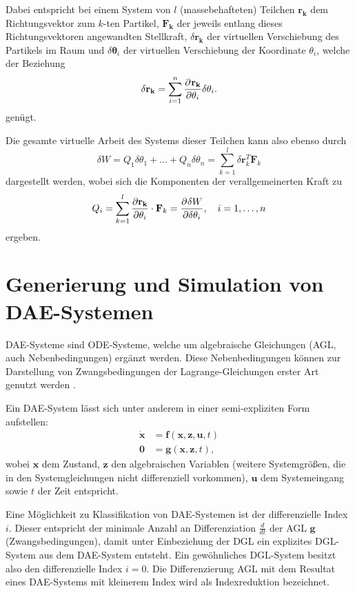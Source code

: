 Dabei entspricht bei einem System von $l$ (massebehafteten) Teilchen $\mathbf{r_k}$ dem Richtungsvektor zum $k$-ten Partikel, $\mathbf{F_k}$ der jeweils entlang dieses Richtungsvektoren angewandten Stellkraft, $\delta \mathbf{r_{k}}$ der virtuellen Verschiebung des Partikels im Raum und $\delta \mathbf{\theta}_{i}$ der virtuellen Verschiebung der Koordinate $\theta_i$, welche der Beziehung
\begin{equation}
	\delta \mathbf{r_{k}} = \sum_{i = 1}^{n} \frac{\partial^{}\mathbf{r_{k}}}{\partial{\theta_i}^{}} \delta \theta_i.
\end{equation}
genügt.

Die gesamte virtuelle Arbeit des Systems dieser Teilchen kann also ebenso durch
\begin{equation}
\delta W = Q_1 \delta \theta_1 + \ldots + Q_n\delta \theta_n = \sum_{k=1}^{l}\delta \mathbf{r}_k^T \mathbf{F}_k
\end{equation}
dargestellt werden, wobei sich die Komponenten der verallgemeinerten Kraft zu
\begin{equation}
Q_i = \sum_{k=1}^l \frac {\partial \mathbf{r_k}} {\partial \theta_i} \cdot \mathbf {F}_{k} = \frac{\partial^{}\delta W}{\partial{\delta \theta_i}^{}} ,\quad i=1,\ldots, n 
\end{equation}
ergeben.
\section{Generierung und Simulation von DAE-Systemen}
DAE-Systeme sind ODE-Systeme, welche um algebraische Gleichungen (AGL, auch Nebenbedingungen) ergänzt werden. Diese Nebenbedingungen können zur Darstellung von Zwangsbedingungen der Lagrange-Gleichungen erster Art genutzt werden \cite[S.137]{JanschekSystementwurf}. 

Ein DAE-System lässt sich unter anderem in einer semi-expliziten Form aufstellen:
	\begin{align}\label{eq:dae_std}
		\mathbf{\dot{x}} &= \mathbf{f}(\mathbf{x}, \mathbf{z}, \mathbf{u}, t) \\
		\mathbf{0} &= \mathbf{g}(\mathbf{x}, \mathbf{z}, t),
	\end{align}
wobei $\mathbf{x}$ dem Zustand, $\mathbf{z}$ den algebraischen Variablen (weitere Systemgrößen, die in den Systemgleichungen nicht differenziell vorkommen), $\mathbf{u}$ dem Systemeingang sowie $t$ der Zeit entspricht.

Eine Möglichkeit zu Klassifikation von DAE-Systemen ist der differenzielle Index $i$. Dieser entspricht der minimale Anzahl an Differenziation $\frac{d}{dt}$ der AGL $\mathbf{g}$ (Zwangsbedingungen), damit unter Einbeziehung der DGL ein explizites DGL-System aus dem DAE-System entsteht. Ein gewöhnliches DGL-System besitzt also den differenzielle Index $i = 0$. Die Differenzierung AGL mit dem Resultat eines DAE-Systems mit kleinerem Index wird als Indexreduktion bezeichnet.

